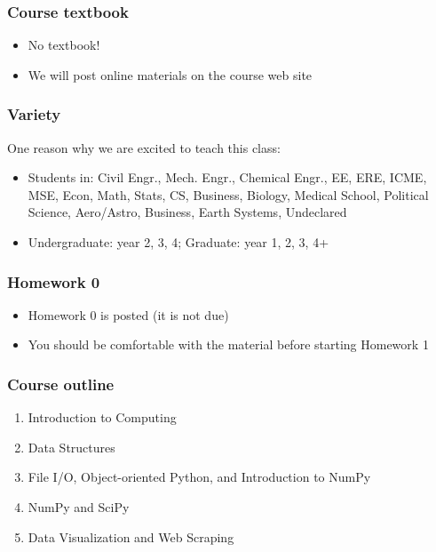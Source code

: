 \documentclass{beamer}
\begin{document}
\begin{frame}
\frametitle{Course textbook}

\begin{itemize}
\setlength{\itemsep}{0.2in}
\item{No textbook!}
\item{We will post online materials on the course web site}
\end{itemize}

\end{frame}


\begin{frame}
\frametitle{Variety}
One reason why we are excited to teach this class:

\begin{itemize}
\item{Students in: Civil Engr., Mech. Engr., Chemical Engr., EE, ERE, ICME, MSE, Econ, Math, Stats, CS, Business, Biology, Medical School, Political Science, Aero/Astro, Business, Earth Systems, Undeclared}
\item{Undergraduate: year 2, 3, 4; Graduate: year 1, 2, 3, 4+}
\end{itemize}

\end{frame}






\begin{frame}
\frametitle{Homework 0}

\begin{itemize}
\item{Homework 0 is posted (it is not due)}
\item{You should be comfortable with the material before starting Homework 1}
\end{itemize}

\end{frame}


\begin{frame}
\frametitle{Course outline}

\begin{enumerate}
\setlength{\itemsep}{0.2in}

\item{Introduction to Computing}
\item{Data Structures}
\item{File I/O, Object-oriented Python, and Introduction to NumPy}
\item{NumPy and SciPy}
\item{Data Visualization and Web Scraping}

\end{enumerate}

\end{frame}
\end{document}
